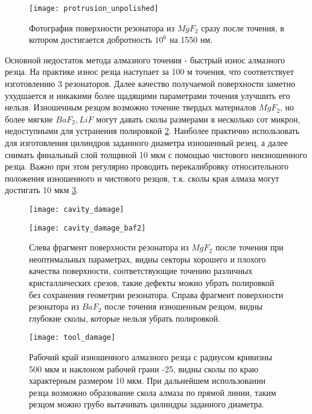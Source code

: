 \begin{figure}[ht]
\centering
  \texttt{[image: protrusion\_unpolished]}
  \caption{Фотография поверхности резонатора из $MgF_2$ сразу после точения, в котором достигается добротность $10^6$ на 1550 нм.}
  \label{protrusion_unpolished}
\end{figure}

Основной недостаток метода алмазного точения - быстрый износ алмазного резца. На практике износ резца наступает за 100 м точения, что соответствует изготовлению 3 резонаторов. Далее качество получаемой поверхности заметно ухудшается и никакими более щадящими параметрами точения улучшить его нельзя. Изношенным резцом возможно точение твердых материалов $MgF_2$, но более мягкие $BaF_2, LiF$ могут давать сколы размерами в несколько сот микрон, недоступными для устранения полировкой \ref{cavity_damage}. Наиболее практично использовать для изготовления цилиндров заданного диаметра изношенный резец, а далее снимать финальный слой толщиной 10 мкм с помощью чистового неизношенного резца. Важно при этом регулярно проводить перекалибровку относительного положения изношенного и чистового резцов, т.к. сколы края алмаза могут достигать 10 мкм \ref{tool_damage}.

\begin{figure}[ht]
  \begin{minipage}[ht]{0.49\linewidth}\centering
    \texttt{[image: cavity\_damage]}
  \end{minipage}
  \hfill
  \begin{minipage}[ht]{0.49\linewidth}\centering
    \texttt{[image: cavity\_damage\_baf2]}
  \end{minipage}
  \caption{Слева фрагмент поверхности резонатора из $MgF_2$ после точения при неоптимальных параметрах, видны секторы хорошего и плохого качества поверхности, соответствующие точению различных кристаллических срезов, такие дефекты можно убрать полировкой без сохранения геометрии резонатора. Справа фрагмент поверхности резонатора из $BaF_2$ после точения изношенным резцом, видны глубокие сколы, которые нельзя убрать полировкой.}
  \label{cavity_damage}
\end{figure}

\begin{figure}[ht]
\centering
  \texttt{[image: tool\_damage]}
  \caption{Рабочий край изношенного алмазного резца с радиусом кривизны 500 мкм и наклоном рабочей грани -25, видны сколы по краю характерным размером 10 мкм. При дальнейшем использовании резца возможно образование скола алмаза по прямой линии, таким резцом можно грубо вытачивать цилиндры заданного диаметра.}
  \label{tool_damage}
\end{figure}

